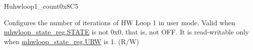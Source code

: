 \begin{register}{H}{uhwloop1\_count}{0x8C5}\label{regdesc:uhloop1_count}
%
%
\regnewline%
\begin{regdesc}\begin{reglist}
\label{fielddesc:UHWLP1_CNT}\item [Count] Configures the number of iterations of HW Loop 1 in user mode. Valid when \hyperref[fielddesc:HWSTATE]{mhwloop\_state\_reg.STATE} is not 0x0, that is, not OFF. It is read-writable only when \hyperref[fielddesc:HWSTATE]{mhwloop\_state\_reg.URW} is 1. (R/W)
\end{reglist}\end{regdesc}
\end{register}
